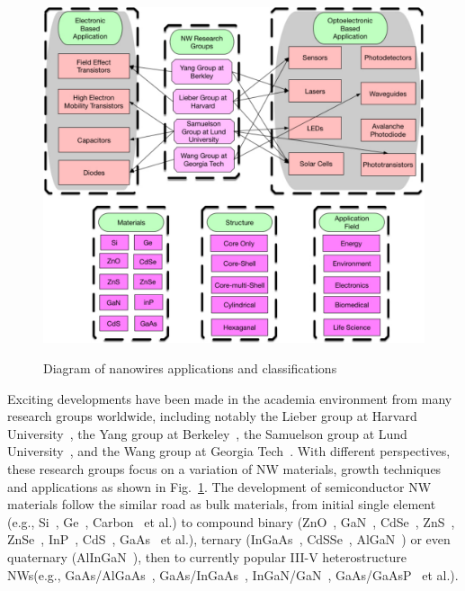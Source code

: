 \begin{figure}
  \caption{Diagram of nanowires applications and classifications}
  \centering
  \includegraphics[width=\textwidth]{pictures/Introduction/NWApplication}
  \label{NWApplication}
\end{figure}


Exciting developments have been made in the academia environment from many
research groups worldwide, including notably the Lieber group at Harvard
University~\cite{Agarwal:2005is,Gradecak:2005eb,Patolsky:2005uz,Duan:2003en,li2006dopant,qian2008multi},
the Yang group at
Berkeley~\cite{Johnson:2003ww,Wu:2002ws,Kind:2002fk,Yang:2002ts,wu2001direct},
the Samuelson group at Lund
University~\cite{Ganjipour:2014cm,Storm:2012gm,Wallentin:2010kf,Thelander:2008uw,Pettersson:2006ft},
and the Wang group at Georgia
Tech~\cite{pan2001nanobelts,wang2006piezoelectric,wang2013nanowires,bae2011fiber,wang2007direct,he2007piezoelectric}.
With different perspectives, these research groups focus on a variation of NW
materials, growth techniques and applications as shown in
Fig.~\ref{NWApplication}. The development of semiconductor NW materials follow
the similar road as bulk materials, from initial single element (e.g.,
Si~\cite{hochbaum2005controlled}, Ge~\cite{wu2000germanium},
Carbon~\cite{zhao2003carbon} et al.) to compound binary
(ZnO~\cite{Johnson:2003ww}, GaN~\cite{Das:2011ci,Gradecak:2005eb},
CdSe~\cite{Persano:2010if}, ZnS~\cite{Ding:2004di}, ZnSe~\cite{xiang2003green},
InP~\cite{Logeeswaran:2008fw}, CdS~\cite{Ding:2004di}, GaAs~\cite{Joyce:2007bl}
et al.), ternary (InGaAs~\cite{Zhao:2014jt}, CdSSe~\cite{pan2006fabrication},
AlGaN~\cite{Li:2015ira}) or even quaternary (AlInGaN~\cite{Wang:2015bi}), then
to currently popular III-V heterostructure NWs(e.g.,
GaAs/AlGaAs~\cite{Peng:2014ia,Wei:2014ws}, GaAs/InGaAs~\cite{Chen:2011ct},
InGaN/GaN~\cite{Zhang:2016tk}, GaAs/GaAsP~\cite{Hua:2009kf} et al.). 

